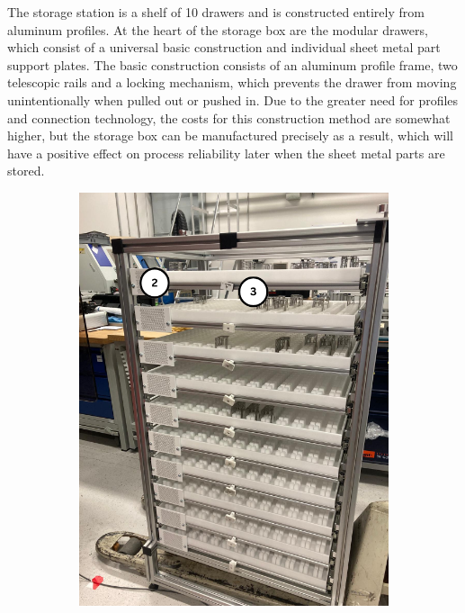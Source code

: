 The storage station is a shelf of 10 drawers and is constructed entirely from aluminum profiles.
At the heart of the storage box are the modular drawers, which consist of a universal basic
construction and individual sheet metal part support plates. The basic construction consists
of an aluminum profile frame, two telescopic rails and a locking mechanism, which prevents the
drawer from moving unintentionally when pulled out or pushed in. Due to the greater need for profiles and
connection technology, the costs for this construction method are somewhat higher, but the storage
box can be manufactured precisely as a result, which will have a positive effect on process reliability
later when the sheet metal parts are stored.

\begin{figure}[h]
    \centering
    \begin{subfigure}{0.35\textwidth}
        \centering
        \includegraphics[width=\textwidth]{figures/storage-station-front.png} %

\end{subfigure}
\end{figure}
